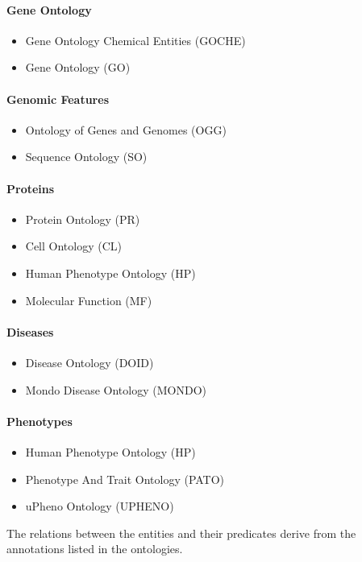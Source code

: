 \begin{multicols}{2}

\paragraph{Gene Ontology}
\begin{itemize}
\item Gene Ontology Chemical Entities (GOCHE)
\item Gene Ontology (GO)
\end{itemize}

\paragraph{Genomic Features}
\begin{itemize}
\item Ontology of Genes and Genomes (OGG)
\item Sequence Ontology (SO)
\end{itemize}

\paragraph{Proteins}
\begin{itemize}
\item Protein Ontology (PR)
\item Cell Ontology (CL)
\item Human Phenotype Ontology (HP)
\item Molecular Function (MF)
\end{itemize}
\bigskip

\paragraph{Diseases}
\begin{itemize}
\item Disease Ontology (DOID)
\item Mondo Disease Ontology (MONDO)
\end{itemize}
\bigskip

\paragraph{Phenotypes}
\begin{itemize}
\item Human Phenotype Ontology (HP)
\item Phenotype And Trait Ontology (PATO)
\item uPheno Ontology (UPHENO)
\end{itemize}
\end{multicols}



The relations between the entities and their predicates derive from the annotations listed in the ontologies. 

